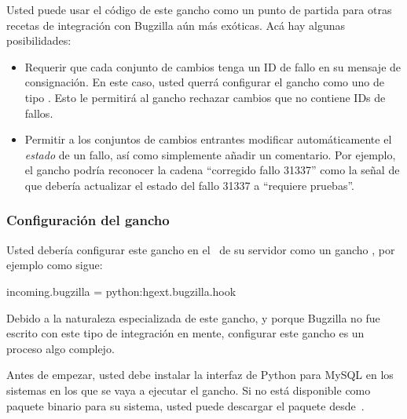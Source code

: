 Usted puede usar el código de este gancho como un punto de partida
para otras recetas de integración con Bugzilla aún más exóticas. Acá
hay algunas posibilidades:
\begin{itemize}
\item Requerir que cada conjunto de cambios tenga un ID de fallo en su
  mensaje de consignación. En este caso, usted querrá configurar el
  gancho como uno de tipo .  Esto le permitirá al
  gancho rechazar cambios que no contiene IDs de fallos.
\item Permitir a los conjuntos de cambios entrantes modificar
  automáticamente el \emph{estado} de un fallo, así como simplemente
  añadir un comentario. Por ejemplo, el gancho podría reconocer la
  cadena ``corregido fallo 31337'' como la señal de que debería
  actualizar el estado del fallo 31337 a ``requiere pruebas''.
\end{itemize}

\subsubsection{Configuración del gancho }
\label{sec:hook:bugzilla:config}

Usted debería configurar este gancho en el \hgrc\ de su servidor como
un gancho , por ejemplo como sigue:
\begin{codesample2}
  [hooks]
  incoming.bugzilla = python:hgext.bugzilla.hook
\end{codesample2}

Debido a la naturaleza especializada de este gancho, y porque Bugzilla
no fue escrito con este tipo de integración en mente, configurar este
gancho es un proceso algo complejo.

Antes de empezar, usted debe instalar la interfaz de Python para MySQL
en los sistemas en los que se vaya a ejecutar el gancho. Si no está
disponible como paquete binario para su sistema, usted puede descargar
el paquete desde~\cite{web:mysql-python}.

